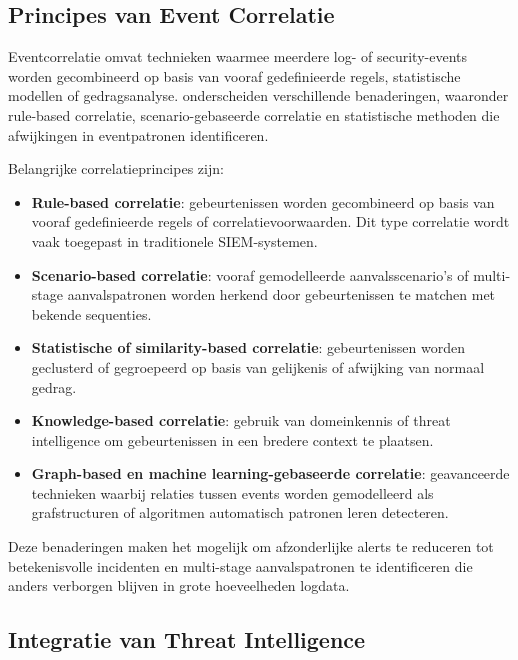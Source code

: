 \subsection{Principes van Event Correlatie}

Eventcorrelatie omvat technieken waarmee meerdere log- of security-events worden gecombineerd op basis van vooraf gedefinieerde regels, statistische modellen of gedragsanalyse. \textcite{kotenko2022securityCorrelation} onderscheiden verschillende benaderingen, waaronder rule-based correlatie, scenario-gebaseerde correlatie en statistische methoden die afwijkingen in eventpatronen identificeren.

Belangrijke correlatieprincipes zijn:

\begin{itemize}
    \item \textbf{Rule-based correlatie}: gebeurtenissen worden gecombineerd op basis van vooraf gedefinieerde regels of correlatievoorwaarden. Dit type correlatie wordt vaak toegepast in traditionele SIEM-systemen.
    
    \item \textbf{Scenario-based correlatie}: vooraf gemodelleerde aanvalsscenario’s of multi-stage aanvalspatronen worden herkend door gebeurtenissen te matchen met bekende sequenties.
    
    \item \textbf{Statistische of similarity-based correlatie}: gebeurtenissen worden geclusterd of gegroepeerd op basis van gelijkenis of afwijking van normaal gedrag.
    
    \item \textbf{Knowledge-based correlatie}: gebruik van domeinkennis of threat intelligence om gebeurtenissen in een bredere context te plaatsen.
    
    \item \textbf{Graph-based en machine learning-gebaseerde correlatie}: geavanceerde technieken waarbij relaties tussen events worden gemodelleerd als grafstructuren of algoritmen automatisch patronen leren detecteren.
\end{itemize}

Deze benaderingen maken het mogelijk om afzonderlijke alerts te reduceren tot betekenisvolle incidenten en multi-stage aanvalspatronen te identificeren die anders verborgen blijven in grote hoeveelheden logdata.

\subsection{Integratie van Threat Intelligence}

